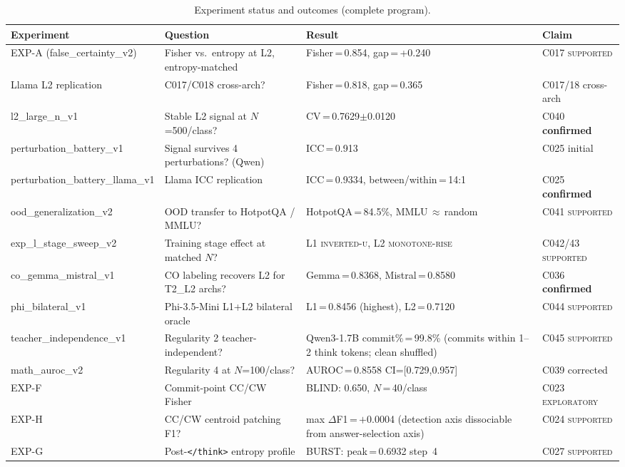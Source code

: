 \documentclass[11pt]{article}
\begin{document}
\begin{table}[h!]
\centering
\small
\caption{Experiment status and outcomes (complete program).}
\begin{tabular}{lL{3.5cm}L{4.5cm}l}
\toprule
Experiment & Question & Result & Claim \\
\midrule
EXP-A (false\_certainty\_v2) & Fisher vs.\ entropy at L2, entropy-matched & Fisher\,=\,0.854, gap\,=\,+0.240 & C017 \textsc{supported} \\
Llama L2 replication & C017/C018 cross-arch? & Fisher\,=\,0.818, gap\,=\,0.365 & C017/18 cross-arch \\
l2\_large\_n\_v1 & Stable L2 signal at $N$=500/class? & CV\,=\,0.7629$\pm$0.0120 & C040 \textbf{confirmed} \\
perturbation\_battery\_v1 & Signal survives 4 perturbations? (Qwen) & ICC\,=\,0.913 & C025 initial \\
perturbation\_battery\_llama\_v1 & Llama ICC replication & ICC\,=\,0.9334, between/within\,=\,14:1 & C025 \textbf{confirmed} \\
ood\_generalization\_v2 & OOD transfer to HotpotQA / MMLU? & HotpotQA\,=\,84.5\%, MMLU\,$\approx$\,random & C041 \textsc{supported} \\
exp\_l\_stage\_sweep\_v2 & Training stage effect at matched $N$? & L1 \textsc{inverted-u}, L2 \textsc{monotone-rise} & C042/43 \textsc{supported} \\
co\_gemma\_mistral\_v1 & CO labeling recovers L2 for T2\_L2 archs? & Gemma\,=\,0.8368, Mistral\,=\,0.8580 & C036 \textbf{confirmed} \\
phi\_bilateral\_v1 & Phi-3.5-Mini L1+L2 bilateral oracle & L1\,=\,0.8456 (highest), L2\,=\,0.7120 & C044 \textsc{supported} \\
teacher\_independence\_v1 & Regularity 2 teacher-independent? & Qwen3-1.7B commit\%\,=\,99.8\% (commits within 1--2 think tokens; clean shuffled) & C045 \textsc{supported} \\
math\_auroc\_v2 & Regularity 4 at $N$=100/class? & AUROC\,=\,0.8558 CI=[0.729,0.957] & C039 corrected \\
EXP-F & Commit-point CC/CW Fisher & BLIND: 0.650, $N$\,=\,40/class & C023 \textsc{exploratory} \\
EXP-H & CC/CW centroid patching F1? & max $\Delta$F1\,=\,$+$0.0004 (detection axis dissociable from answer-selection axis) & C024 \textsc{supported} \\
EXP-G & Post-\texttt{</think>} entropy profile & BURST: peak\,=\,0.6932 step~4 & C027 \textsc{supported} \\

\end{tabular}
\end{table}
\end{document}
